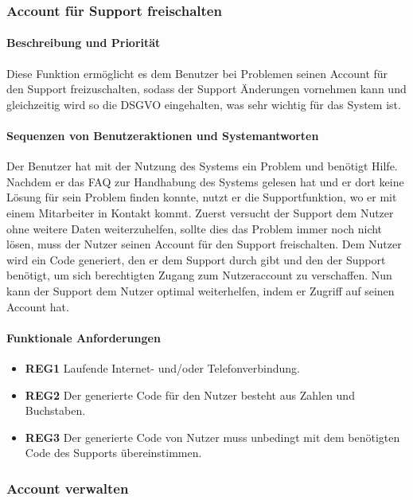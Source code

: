 \subsubsection{Account für Support freischalten}
\label{sys_feat:freischalten}
\paragraph{Beschreibung und Priorität}
Diese Funktion ermöglicht es dem Benutzer bei Problemen seinen Account für den Support freizuschalten, sodass der Support Änderungen vornehmen kann und gleichzeitig wird so die DSGVO eingehalten, was sehr wichtig für das System ist.
\paragraph{Sequenzen von Benutzeraktionen und Systemantworten} 
Der Benutzer hat mit der Nutzung des Systems ein Problem und benötigt Hilfe. Nachdem er das FAQ zur Handhabung des Systems gelesen hat und er dort keine Lösung für sein Problem finden konnte, nutzt er die Supportfunktion, wo er mit einem Mitarbeiter in Kontakt kommt. Zuerst versucht der Support dem Nutzer ohne weitere Daten weiterzuhelfen, sollte dies das Problem immer noch nicht lösen, muss der Nutzer seinen Account für den Support freischalten. Dem Nutzer wird ein Code generiert, den er dem Support durch gibt und den der Support benötigt, um sich berechtigten Zugang zum Nutzeraccount zu verschaffen. Nun kann der  Support dem Nutzer optimal weiterhelfen, indem er Zugriff auf seinen Account hat.
\paragraph{Funktionale Anforderungen}
\begin{itemize}
	\item \textbf{REG1} Laufende Internet- und/oder Telefonverbindung.
	\item \textbf{REG2} Der generierte Code für den Nutzer besteht aus Zahlen und Buchstaben.
	\item \textbf{REG3} Der generierte Code von Nutzer muss unbedingt mit dem benötigten Code des Supports übereinstimmen.
	
\end{itemize}

\subsubsection{Account verwalten}

